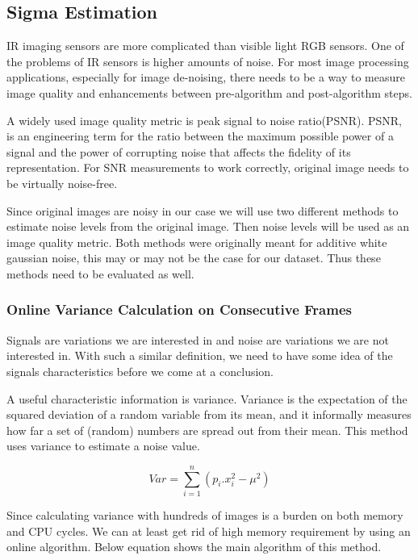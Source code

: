 \documentclass[10pt,twocolumn,letterpaper]{article}
\begin{document}
\subsection{Sigma Estimation}
IR imaging sensors are more complicated than visible light RGB sensors. One of the problems of IR sensors is higher amounts of noise.
For most image processing applications, especially for image de-noising, there needs to be a way to measure image quality and enhancements between pre-algorithm and post-algorithm steps.

A widely used image quality metric is peak signal to noise ratio(PSNR). PSNR, is an engineering term for the ratio between the maximum possible power of a signal and the power of corrupting noise that affects the fidelity of its representation\cite{wiki:psnr}. For SNR measurements to work correctly, original image needs to be virtually noise-free.

Since original images are noisy in our case we will use two different methods to estimate noise levels from the original image. Then noise levels will be used as an image quality metric. Both methods were originally meant for additive white gaussian noise, this may or may not be the case for our dataset. Thus these methods need to be evaluated as well.
\subsubsection{Online Variance Calculation on Consecutive Frames} \label{ss:online-var}
Signals are variations we are interested in and noise are variations we are not interested in. With such a similar definition, we need to have some idea of the signals characteristics before we come at a conclusion. 

A useful characteristic information is variance. Variance is the expectation of the squared deviation of a random variable from its mean, and it informally measures how far a set of (random) numbers are spread out from their mean\cite{wiki:variance}. This method uses variance to estimate a noise value.

\begin{displaymath}
Var = \sum_{i=1}^{n} (p_i.x^2_i - \mu^2)
\end{displaymath}\label{eq:disc-var}

Since calculating variance with hundreds of images is a burden on both memory and CPU cycles. We can at least get rid of high memory requirement by using an online algorithm. Below equation shows the main algorithm of this method.
\end{document}
